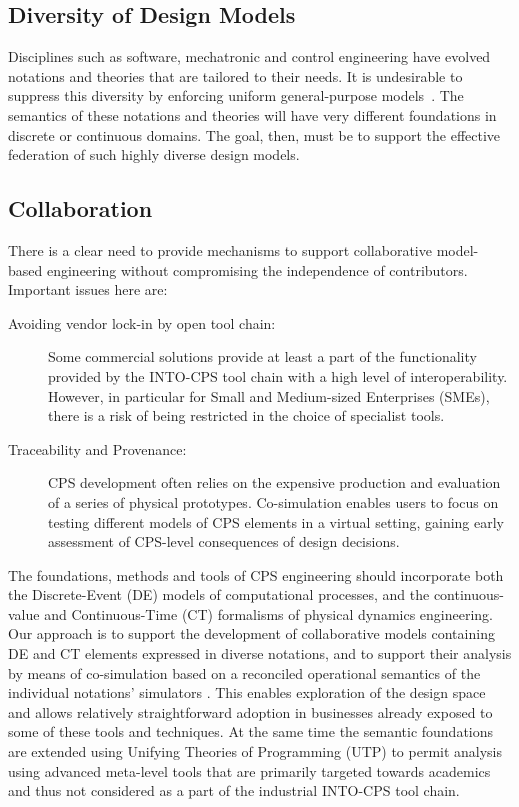 \subsection{Diversity of Design Models}

Disciplines such as software, mechatronic and control engineering have evolved notations and theories that are tailored to their needs. It is undesirable to suppress this diversity by enforcing uniform general-purpose models~\cite{Fitzgerald&15,Larsen&16e}. The semantics of these notations and theories will have very different foundations in discrete or continuous domains. The goal, then, must be to support the effective federation of such highly diverse design models.

\subsection{Collaboration}

There is a clear need to provide mechanisms to support collaborative model-based engineering without compromising the independence of contributors. Important issues here are:
\begin{description}
\item[Avoiding vendor lock-in by open tool chain:] Some commercial solutions provide at least a part of the functionality provided by the INTO-CPS tool chain with a high level of interoperability. However, in particular for Small and Medium-sized Enterprises (SMEs), there is a risk of being restricted in the choice of specialist tools.
\item[Traceability and Provenance:] CPS development often relies on the expensive production and evaluation of a series of physical prototypes. Co-simulation enables users to focus on testing different models of CPS elements in a virtual setting, gaining early assessment of CPS-level consequences of design decisions.
\end{description}

The foundations, methods and tools of CPS engineering should incorporate both the Discrete-Event (DE) models of computational processes, and the continuous-value and Continuous-Time (CT) formalisms of physical dynamics engineering. Our approach is to support the development of collaborative models containing DE and CT elements expressed in diverse notations, and to support their analysis by means of co-simulation based on a reconciled operational semantics of the individual notations' simulators \cite{Fitzgerald&14c}. This enables exploration of the design space and allows relatively straightforward adoption in businesses already exposed to some of these tools and techniques. At the same time the semantic foundations are extended using Unifying Theories of Programming (UTP) to permit analysis using advanced meta-level tools that are primarily targeted towards academics and thus not considered as a part of the industrial INTO-CPS tool chain.

